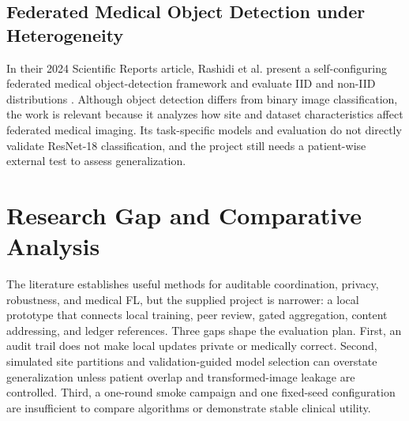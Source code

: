 \documentclass[12pt,a4paper]{report}
\begin{document}
\subsection{Federated Medical Object Detection under Heterogeneity}
In their 2024 Scientific Reports article, Rashidi et al. present a self-configuring federated medical object-detection framework and evaluate IID and non-IID distributions \cite{rashidi2024detection}. Although object detection differs from binary image classification, the work is relevant because it analyzes how site and dataset characteristics affect federated medical imaging. Its task-specific models and evaluation do not directly validate ResNet-18 classification, and the project still needs a patient-wise external test to assess generalization.

\section{Research Gap and Comparative Analysis}
The literature establishes useful methods for auditable coordination, privacy, robustness, and medical FL, but the supplied project is narrower: a local prototype that connects local training, peer review, gated aggregation, content addressing, and ledger references. Three gaps shape the evaluation plan. First, an audit trail does not make local updates private or medically correct. Second, simulated site partitions and validation-guided model selection can overstate generalization unless patient overlap and transformed-image leakage are controlled. Third, a one-round smoke campaign and one fixed-seed configuration are insufficient to compare algorithms or demonstrate stable clinical utility.
\end{document}
